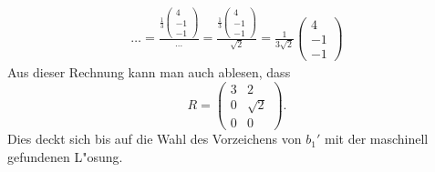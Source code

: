 \begin{loesung}
\begin{align*}
{}{\dots}
=\frac{\displaystyle\frac13\begin{pmatrix}4\\-1\\-1\end{pmatrix}}{\dots}
=\frac{\displaystyle\frac13\begin{pmatrix}4\\-1\\-1\end{pmatrix}}{\sqrt{2}}
=\frac1{3\sqrt{2}}\begin{pmatrix}4\\-1\\-1 \end{pmatrix}
\end{align*}
Aus dieser Rechnung kann man auch ablesen, dass 
\[
R=\begin{pmatrix}
3&2\\
0&\sqrt{2}\\
0&0
\end{pmatrix}.
\]
Dies deckt sich bis auf die Wahl des Vorzeichens von $b_1'$ mit der
maschinell gefundenen L"osung.
\end{loesung}

